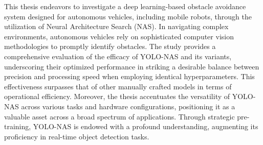 This thesis endeavors to investigate a deep learning-based obstacle avoidance system designed for autonomous vehicles, including mobile robots, through the utilization of Neural Architecture Search (NAS). In navigating complex environments, autonomous vehicles rely on sophisticated computer vision methodologies to promptly identify obstacles. The study provides a comprehensive evaluation of the efficacy of YOLO-NAS and its variants, underscoring their optimized performance in striking a desirable balance between precision and processing speed when employing identical hyperparameters. This effectiveness surpasses that of other manually crafted models in terms of operational efficiency. Moreover, the thesis accentuates the versatility of YOLO-NAS across various tasks and hardware configurations, positioning it as a valuable asset across a broad spectrum of applications. Through strategic pre-training, YOLO-NAS is endowed with a profound understanding, augmenting its proficiency in real-time object detection tasks.
